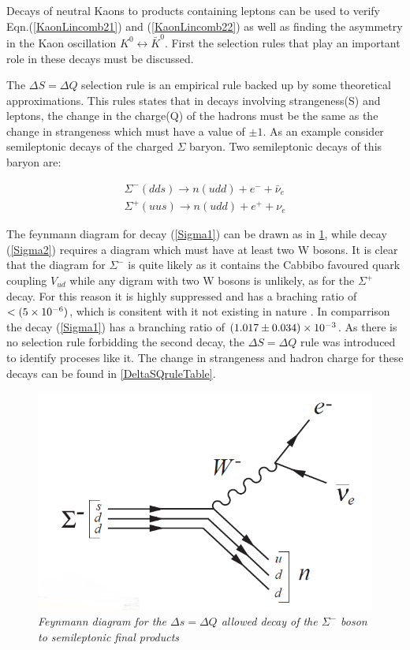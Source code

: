 Decays of neutral Kaons to products containing leptons can be used to verify Eqn.(\ref{KaonLincomb21}) and (\ref{KaonLincomb22}) as well as finding the asymmetry in the Kaon oscillation $K^{0} \leftrightarrow \bar{K}^{0}$. First the selection rules that play an important role in these decays must be discussed.

The $\Delta S = \Delta Q$ selection rule is an empirical rule backed up by some theoretical approximations. This rules states that in decays involving strangeness(S) and leptons, the change in the charge(Q) of the hadrons must be the same as the change in strangeness which must have a value of $\pm 1$. As an example consider semileptonic decays of the charged $\Sigma$ baryon. Two semileptonic decays of this baryon are:

\begin{align}
\label{Sigma1}
\Sigma^{-} (dds) \rightarrow n(udd) + e^{-} + \bar{\nu}_{e} \\
\label{Sigma2}
\Sigma^{+} (uus) \rightarrow n(udd) + e^{+} + \nu_{e}
\end{align}  

\noindent The feynmann diagram for decay (\ref{Sigma1}) can be drawn as in \cref{KevFeyn2}, while decay (\ref{Sigma2}) requires a diagram which must have at least two W bosons. It is clear that the diagram for $\Sigma^{-}$ is quite likely as it contains the Cabbibo favoured quark coupling $V_{ud}$ while any digram with two W bosons is unlikely, as for the $\Sigma^{+}$ decay. For this reason it is highly suppressed and has a braching ratio of $< (5\times 10^{-6})$, which is consitent with it not existing in nature \cite{PDGKaons}. In comparrison the decay (\ref{Sigma1}) has a branching ratio of $(1.017 \pm 0.034) \times 10^{-3}$. As there is no selection rule forbidding the second decay, the $\Delta S = \Delta Q$ rule was introduced to identify proceses like it. The change in strangeness and hadron charge for these decays can be found in \cref{DeltaSQruleTable}.

\begin{figure}[h!]
\begin{center}
\includegraphics[scale=0.4]{figs/KevFeyn2.png}
\end{center}
\caption{\textit{Feynmann diagram for the $\Delta s = \Delta Q$ allowed decay of the $\Sigma^{-}$ boson to semileptonic final products}}
\label{KevFeyn2}
\end{figure}


